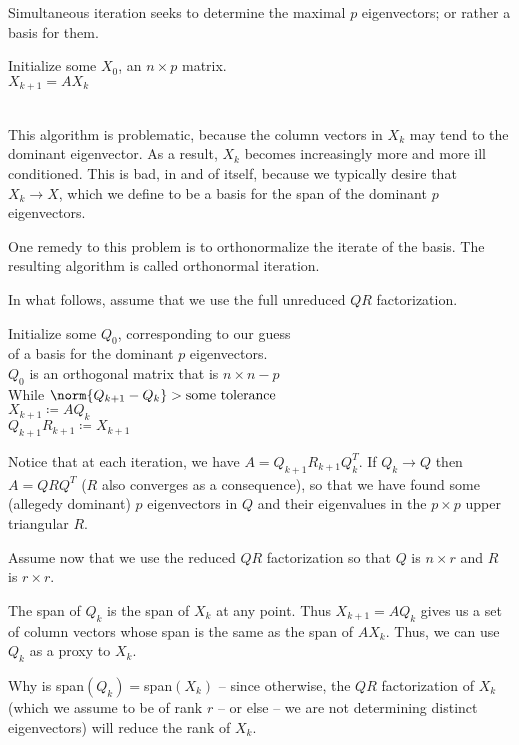 \documentclass[../main.tex]{subfiles}
\begin{document}
\begin{definition}
    Simultaneous iteration seeks to determine the maximal $p$ eigenvectors; or rather a basis for them.
    \begin{algo}
        Initialize some $X_0$, an $n \times p$ matrix. \\
        $X_{k+1} = AX_{k}$ \\
         \\
    \end{algo}
\end{definition}

\begin{remark}
    This algorithm is problematic, because the column vectors in $X_k$ may tend to the dominant eigenvector. As a result, $X_k$ becomes increasingly more and more ill conditioned. This is bad, in and of itself, because we typically desire that $X_k \to X$, which we define to be a basis for the span of the dominant $p$ eigenvectors.
\end{remark}

\begin{definition}
    One remedy to this problem is to orthonormalize the iterate of the basis. The resulting algorithm is called orthonormal iteration.

    In what follows, assume that we use the full unreduced $QR$ factorization.

    \begin{algo}
        Initialize some $Q_0$, corresponding to our guess \\
        of a basis for the dominant $p$ eigenvectors.\\
        $Q_0$ is an orthogonal matrix that is $n \times n-p$ \\
        While $\norm{Q_{k+1} - Q_{k}} > \text{some tolerance}$ \+\\
        $X_{k+1} \coloneq AQ_{k}$ \\
        $Q_{k+1}R_{k+1} \coloneq X_{k+1}$ \\
    \end{algo}

    Notice that at each iteration, we have $A = Q_{k+1}R_{k+1}Q_{k}^T$. If $Q_k \to Q$ then $A = QRQ^{T}$ ($R$ also converges as a consequence), so that we have found some (allegedy dominant) $p$ eigenvectors in $Q$ and their eigenvalues in the $p \times p$ upper triangular $R$.
\end{definition}


\begin{remark}
    Assume now that we use the reduced $QR$ factorization so that $Q$ is $n \times r$ and $R$ is $r \times r$.

    The span of $Q_k$ is the span of $X_k$ at any point. Thus $X_{k+1} = A Q_{k}$ gives us a set of column vectors whose span is the same as the span of $AX_{k}$. Thus, we can use $Q_k$ as a proxy to $X_k$.

    Why is span$(Q_k) = $span$(X_k)$ -- since otherwise, the $QR$ factorization of $X_k$ (which we assume to be of rank $r$ -- or else -- we are not determining distinct eigenvectors) will reduce the rank of $X_k$.
\end{remark}
\end{document}
